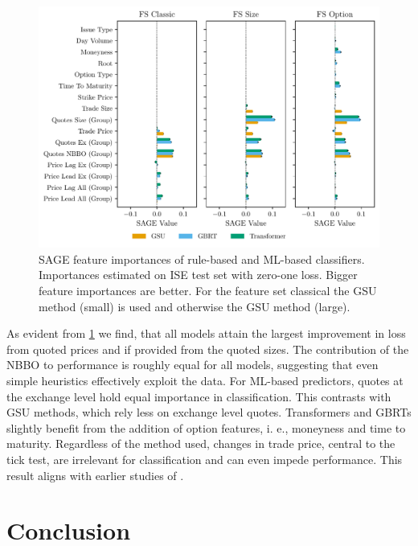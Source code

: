 \documentclass[oneside,a4paper,10pt]{article} %
\begin{document}
\begin{figure}[h]
    \centering
    \includegraphics[width=1\textwidth]{sage-importances.pdf}
    \caption[ Feature Importances]{\gls{SAGE} feature importances of rule-based and \gls{ML}-based classifiers. Importances estimated on \gls{ISE} test set with zero-one loss. Bigger feature importances are better. For the feature set classical the \gls{GSU} method (small) is used and otherwise the \gls{GSU} method (large).}
    \label{fig:sage-importances}
\end{figure}

As evident from \cref{fig:sage-importances} we find, that all models attain the largest improvement in loss from quoted prices and if provided from the quoted sizes. The contribution of the \gls{NBBO} to performance is roughly equal for all models, suggesting that even simple heuristics effectively exploit the data. For \gls{ML}-based predictors, quotes at the exchange level hold equal importance in classification. This contrasts with \gls{GSU} methods, which rely less on exchange level quotes. Transformers and \glspl{GBRT} slightly benefit from the addition of option features, i. e., moneyness and time to maturity. Regardless of the method used, changes in trade price, central to the tick test, are irrelevant for classification and can even impede performance. This result aligns with earlier studies of \textcites{savickasInferringDirectionOption2003}{grauerOptionTradeClassification2022}.

\section{Conclusion}
\end{document}
